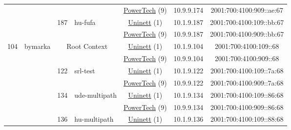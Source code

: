 \begin{small}
\begin{center}
\begin{longtable}{|c|c|c|c|c|c|c|c|}
  &  &  &  & \multicolumn{2}{|c|}{\tiny{\href{http://www.powertech.no}{PowerTech} (9)}} & \tiny{10.9.9.174} & \tiny{2001:700:4100:909::ae:67} \\* \cline{3-3}\cline{4-4}\cline{5-5}\cline{6-6}\cline{7-7}\cline{8-8}
  &  & \multirow{2}{*}{\tiny{187}} & \multicolumn{1}{|l|}{\multirow{2}{*}{\tiny{hu-fufa}}} & \multicolumn{2}{|c|}{\tiny{\href{https://www.uninett.no}{Uninett} (1)}} & \tiny{10.1.9.187} & \tiny{2001:700:4100:109::bb:67} \\* \cline{5-5}\cline{6-6}\cline{7-7}\cline{8-8}
  &  &  &  & \multicolumn{2}{|c|}{\tiny{\href{http://www.powertech.no}{PowerTech} (9)}} & \tiny{10.9.9.187} & \tiny{2001:700:4100:909::bb:67} \\ \hline
 \multirow{32}{*}{\tiny{104}} & \multicolumn{1}{|l|}{\multirow{32}{*}{\tiny{bymarka}}} & \multicolumn{2}{|c|}{\multirow{2}{*}{\tiny{Root Context}}} & \multicolumn{2}{|c|}{\tiny{\href{https://www.uninett.no}{Uninett} (1)}} & \tiny{10.1.9.104} & \tiny{2001:700:4100:109::68} \\* \cline{5-5}\cline{6-6}\cline{7-7}\cline{8-8}
  &  & \multicolumn{2}{|c|}{} & \multicolumn{2}{|c|}{\tiny{\href{http://www.powertech.no}{PowerTech} (9)}} & \tiny{10.9.9.104} & \tiny{2001:700:4100:909::68} \\* \cline{3-3}\cline{4-4}\cline{5-5}\cline{6-6}\cline{7-7}\cline{8-8}
  &  & \multirow{2}{*}{\tiny{122}} & \multicolumn{1}{|l|}{\multirow{2}{*}{\tiny{srl-test}}} & \multicolumn{2}{|c|}{\tiny{\href{https://www.uninett.no}{Uninett} (1)}} & \tiny{10.1.9.122} & \tiny{2001:700:4100:109::7a:68} \\* \cline{5-5}\cline{6-6}\cline{7-7}\cline{8-8}
  &  &  &  & \multicolumn{2}{|c|}{\tiny{\href{http://www.powertech.no}{PowerTech} (9)}} & \tiny{10.9.9.122} & \tiny{2001:700:4100:909::7a:68} \\* \cline{3-3}\cline{4-4}\cline{5-5}\cline{6-6}\cline{7-7}\cline{8-8}
  &  & \multirow{2}{*}{\tiny{134}} & \multicolumn{1}{|l|}{\multirow{2}{*}{\tiny{ude-multipath}}} & \multicolumn{2}{|c|}{\tiny{\href{https://www.uninett.no}{Uninett} (1)}} & \tiny{10.1.9.134} & \tiny{2001:700:4100:109::86:68} \\* \cline{5-5}\cline{6-6}\cline{7-7}\cline{8-8}
  &  &  &  & \multicolumn{2}{|c|}{\tiny{\href{http://www.powertech.no}{PowerTech} (9)}} & \tiny{10.9.9.134} & \tiny{2001:700:4100:909::86:68} \\* \cline{3-3}\cline{4-4}\cline{5-5}\cline{6-6}\cline{7-7}\cline{8-8}
  &  & \multirow{2}{*}{\tiny{136}} & \multicolumn{1}{|l|}{\multirow{2}{*}{\tiny{hu-multipath}}} & \multicolumn{2}{|c|}{\tiny{\href{https://www.uninett.no}{Uninett} (1)}} & \tiny{10.1.9.136} & \tiny{2001:700:4100:109::88:68} \\* \cline{5-5}\cline{6-6}\cline{7-7}\cline{8-8}

\end{longtable}
\end{center}
\end{small}
